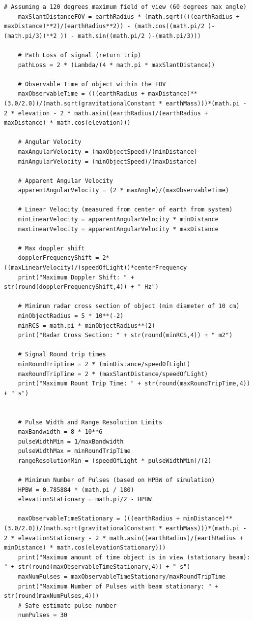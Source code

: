 \documentclass[11pt]{witseiepaper}
\begin{document}
\begin{bibunit}[witseie]
\begin{lstlisting}[breaklines=true, postbreak=\mbox{\textcolor{red}{$\hookrightarrow$}\space}]
    # Assuming a 120 degrees maximum field of view (60 degrees max angle)
    maxSlantDistanceFOV = earthRadius * (math.sqrt((((earthRadius + maxDistance)**2)/(earthRadius**2)) - (math.cos((math.pi/2 )-(math.pi/3))**2 )) - math.sin((math.pi/2 )-(math.pi/3))) 
    
    # Path Loss of signal (return trip)
    pathLoss = 2 * (Lambda/(4 * math.pi * maxSlantDistance))
    
    # Observable Time of object within the FOV
    maxObservableTime = (((earthRadius + maxDistance)**(3.0/2.0))/(math.sqrt(gravitationalConstant * earthMass)))*(math.pi - 2 * elevation - 2 * math.asin((earthRadius)/(earthRadius + maxDistance) * math.cos(elevation)))
    
    # Angular Velocity
    maxAngularVelocity = (maxObjectSpeed)/(minDistance)
    minAngularVelocity = (minObjectSpeed)/(maxDistance)
    
    # Apparent Angular Velocity
    apparentAngularVelocity = (2 * maxAngle)/(maxObservableTime)
    
    # Linear Velocity (measured from center of earth from system)
    minLinearVelocity = apparentAngularVelocity * minDistance
    maxLinearVelocity = apparentAngularVelocity * maxDistance
    
    # Max doppler shift
    dopplerFrequencyShift = 2*((maxLinearVelocity)/(speedOfLight))*centerFrequency 
    print("Maximum Doppler Shift: " + str(round(dopplerFrequencyShift,4)) + " Hz")
    
    # Minimum radar cross section of object (min diameter of 10 cm)
    minObjectRadius = 5 * 10**(-2)
    minRCS = math.pi * minObjectRadius**(2)
    print("Radar Cross Section: " + str(round(minRCS,4)) + " m2")
    
    # Signal Round trip times
    minRoundTripTime = 2 * (minDistance/speedOfLight)
    maxRoundTripTime = 2 * (maxSlantDistance/speedOfLight)
    print("Maximum Rount Trip Time: " + str(round(maxRoundTripTime,4)) + " s")
    
    
    # Pulse Width and Range Resolution Limits
    maxBandwidth = 8 * 10**6
    pulseWidthMin = 1/maxBandwidth
    pulseWidthMax = minRoundTripTime
    rangeResolutionMin = (speedOfLight * pulseWidthMin)/(2)
    
    # Minimum Number of Pulses (based on HPBW of simulation)
    HPBW = 0.785884 * (math.pi / 180)
    elevationStationary = math.pi/2 - HPBW
    
    maxObservableTimeStationary = (((earthRadius + minDistance)**(3.0/2.0))/(math.sqrt(gravitationalConstant * earthMass)))*(math.pi - 2 * elevationStationary - 2 * math.asin((earthRadius)/(earthRadius + minDistance) * math.cos(elevationStationary)))
    print("Maximum amount of time object is in view (stationary beam): " + str(round(maxObservableTimeStationary,4)) + " s")
    maxNumPulses = maxObservableTimeStationary/maxRoundTripTime
    print("Maximum Number of Pulses with beam stationary: " + str(round(maxNumPulses,4)))
    # Safe estimate pulse number
    numPulses = 30
    

\end{lstlisting}
\end{bibunit}
\end{document}
